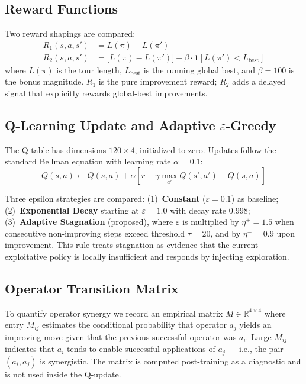 \documentclass{article}
\begin{document}
\subsection{Reward Functions}

Two reward shapings are compared:
\begin{align}
R_1(s, a, s') &= L(\pi) - L(\pi') \label{eq:r1} \\
R_2(s, a, s') &= \bigl[L(\pi) - L(\pi')\bigr] + \beta \cdot \mathbf{1}[L(\pi') < L_{\text{best}}] \label{eq:r2}
\end{align}
where $L(\pi)$ is the tour length, $L_{\text{best}}$ is the running global best,
and $\beta = 100$ is the bonus magnitude. $R_1$ is the pure improvement reward;
$R_2$ adds a delayed signal that explicitly rewards global-best improvements.

\subsection{Q-Learning Update and Adaptive $\varepsilon$-Greedy}

The Q-table has dimensions $120 \times 4$, initialized to zero. Updates follow
the standard Bellman equation with learning rate $\alpha = 0.1$:
\begin{equation}
Q(s, a) \leftarrow Q(s, a) + \alpha \left[ r + \gamma \max_{a'} Q(s', a') - Q(s, a) \right]
\end{equation}

Three epsilon strategies are compared: (1)~\textbf{Constant} ($\varepsilon =
0.1$) as baseline; (2)~\textbf{Exponential Decay} starting at $\varepsilon =
1.0$ with decay rate 0.998; (3)~\textbf{Adaptive Stagnation} (proposed), where
$\varepsilon$ is multiplied by $\eta^+ = 1.5$ when consecutive non-improving
steps exceed threshold $\tau = 20$, and by $\eta^- = 0.9$ upon improvement.
This rule treats stagnation as evidence that the current exploitative policy is
locally insufficient and responds by injecting exploration.

\subsection{Operator Transition Matrix}

To quantify operator synergy we record an empirical matrix $M \in \mathbb{R}^{4
\times 4}$ where entry $M_{ij}$ estimates the conditional probability that
operator $a_j$ yields an improving move given that the previous successful
operator was $a_i$. Large $M_{ij}$ indicates that $a_i$ tends to enable
successful applications of $a_j$ --- i.e., the pair $(a_i, a_j)$ is
synergistic. The matrix is computed post-training as a diagnostic and is not
used inside the Q-update.
\end{document}
